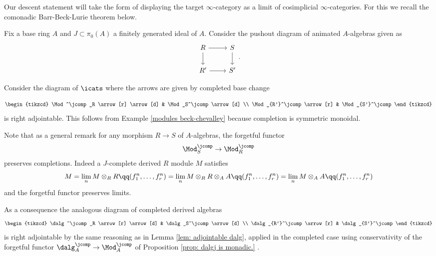 \documentclass[10pt,reqno]{amsart}
\numberwithin{equation}{section}
\begin{document}
Our descent statement will take the form of displaying the target $\infty$-category as a limit of cosimplicial $\infty$-categories. For this we recall the comonadic Barr-Beck-Lurie theorem below.


\begin{variant}\label{variant: completed adjointability}
Fix a base ring $A$ and $J\subset \pi_0(A)$ a finitely generated ideal of $A.$ Consider the pushout diagram of animated $A$-algebras given as 
$$%
\begin{tikzcd}
R \arrow[r] \arrow[d] & S \arrow[d] \\
R' \arrow[r]          & S'         
\end{tikzcd}.$$

Consider the diagram of $\icats$ where the arrows are given by completed base change 

$$%
\begin{tikzcd}
\Mod^\jcomp_R \arrow[r] \arrow[d] & \Mod_S^\jcomp \arrow[d] \\
\Mod_{R'}^\jcomp \arrow[r]        & \Mod_{S'}^\jcomp       
\end{tikzcd}$$ is right adjointable. 
This follows from Example \ref{modules beck-chevalley} because completion is symmetric monoidal. 

Note that as a general remark for any morphism $R\to S$ of $A$-algebras, the forgetful functor $$\Mod_S^\jcomp\to \Mod_R^\jcomp$$ preserves completions. Indeed a $J$-complete derived $R$ module $M$ satisfies 
    $$M=\lim_n M\otimes_R R\qq (f^n_1,\ldots, f^n_r)=\lim_n M\otimes_R R\otimes_A A\qq (f^n_1,\ldots, f^n_r)=\lim_n M\otimes_A A\qq (f^n_1,\ldots, f^n_r)$$ and the forgetful functor preserves limits. 

As a consequence the analogous diagram of completed derived algebras
$$
\begin{tikzcd}
\dalg^\jcomp_R \arrow[r] \arrow[d] & \dalg_S^\jcomp \arrow[d] \\
\dalg_{R'}^\jcomp \arrow[r]        & \dalg_{S'}^\jcomp       
\end{tikzcd}$$
 is right adjointable by the same reasoning as in Lemma \ref{lem: adjointable dalg}, applied in the completed case using conservativity of the forgetful functor $\dalg_A^\jcomp\to \Mod_A^\jcomp$ of Proposition \ref{prop: dalgj is monadic.} .   
\end{variant}
\end{document}
